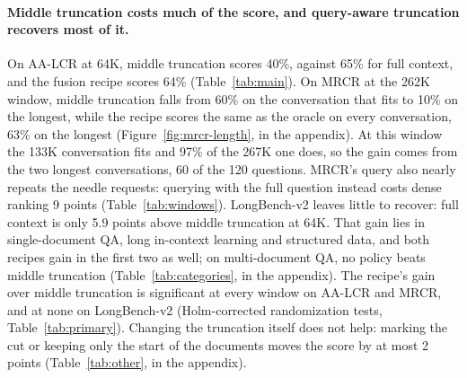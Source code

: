\documentclass[letterpaper]{article} %
\newcommand{\recipe}{fusion recipe}
\begin{document}
\paragraph{Middle truncation costs much of the score, and query-aware truncation recovers most of it.} On AA-LCR at 64K, middle truncation scores 40\%, against 65\% for full context, and the \recipe{} scores 64\% (Table~\ref{tab:main}). On MRCR at the 262K window, middle truncation falls from 60\% on the conversation that fits to 10\% on the longest, while the recipe scores the same as the oracle on every conversation, 63\% on the longest (Figure~\ref{fig:mrcr-length}, in the appendix). At this window the 133K conversation fits and 97\% of the 267K one does, so the gain comes from the two longest conversations, 60 of the 120 questions. MRCR's query also nearly repeats the needle requests: querying with the full question instead costs dense ranking 9 points (Table~\ref{tab:windows}). LongBench-v2 leaves little to recover: full context is only 5.9 points above middle truncation at 64K. That gain lies in single-document QA, long in-context learning and structured data, and both recipes gain in the first two as well; on multi-document QA, no policy beats middle truncation (Table~\ref{tab:categories}, in the appendix). The recipe's gain over middle truncation is significant at every window on AA-LCR and MRCR, and at none on LongBench-v2 (Holm-corrected randomization tests, Table~\ref{tab:primary}). Changing the truncation itself does not help: marking the cut or keeping only the start of the documents moves the score by at most 2 points (Table~\ref{tab:other}, in the appendix).
\end{document}
